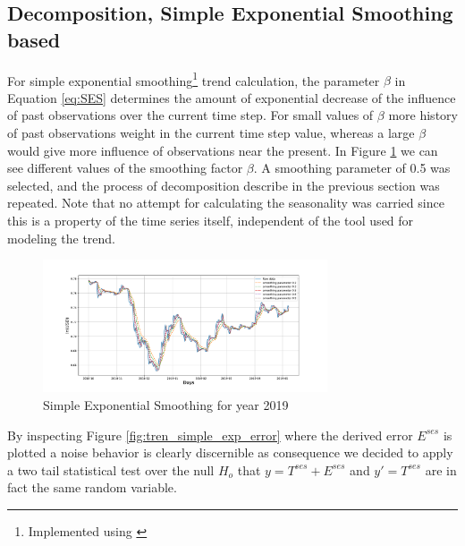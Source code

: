 \subsection{Decomposition, Simple Exponential Smoothing based}


For simple exponential smoothing\footnote{Implemented using \cite{Statsmodels}} trend calculation, the parameter $\beta$ in Equation \ref{eq:SES} determines the amount of exponential decrease of the influence of past observations over the current time step. For small values of $\beta$ more history of past observations weight in the current time step value, whereas a large $\beta$ would give more influence of observations near the present. In Figure \ref{fig:tren_simple_exp} we can see different values of the smoothing factor $\beta$. A smoothing parameter of 0.5 was selected, and the process of decomposition describe in the previous section was repeated. Note that no attempt for calculating the seasonality was carried since this is a property of the time series itself, independent of the tool used for modeling the trend.

\begin{figure}[h!] %
	\centering %
	\includegraphics[width=0.75\textwidth]{data/trend_SES.pdf} %
	\caption{Simple Exponential Smoothing for year 2019} %
	\label{fig:tren_simple_exp} %
\end{figure}

By inspecting Figure \ref{fig:tren_simple_exp_error} where the derived error $E^{ses}$ is plotted a noise behavior is clearly discernible as consequence we  decided to apply  a two tail statistical test over the null $H_{o}$ that $y=T^{ses}+E^{ses}$ and $y'=T^{ses}$ are in fact the same random variable.

